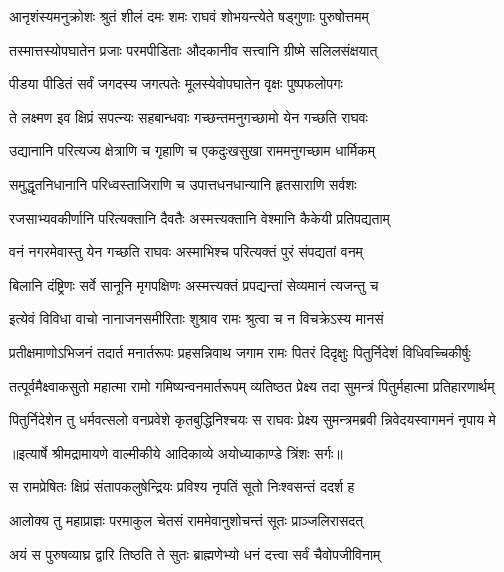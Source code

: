 \twolineshloka
{आनृशंस्यमनुक्रोशः श्रुतं शीलं दमः शमः}
{राघवं शोभयन्त्येते षड्गुणाः पुरुषोत्तमम्} %

\twolineshloka
{तस्मात्तस्योपघातेन प्रजाः परमपीडिताः}
{औदकानीव सत्त्वानि ग्रीष्मे सलिलसंक्षयात्} %

\twolineshloka
{पीडया पीडितं सर्वं जगदस्य जगत्पतेः}
{मूलस्येवोपघातेन वृक्षः पुष्पफलोपगः} %

\twolineshloka
{ते लक्ष्मण इव क्षिप्रं सपत्न्यः सहबान्धवाः}
{गच्छन्तमनुगच्छामो येन गच्छति राघवः} %

\twolineshloka
{उद्यानानि परित्यज्य क्षेत्राणि च गृहाणि च}
{एकदुःखसुखा राममनुगच्छाम धार्मिकम्} %

\twolineshloka
{समुद्धृतनिधानानि परिध्वस्ताजिराणि च}
{उपात्तधनधान्यानि हृतसाराणि सर्वशः} %

\twolineshloka
{रजसाभ्यवकीर्णानि परित्यक्तानि दैवतैः}
{अस्मत्त्यक्तानि वेश्मानि कैकेयी प्रतिपद्यताम्} %

\twolineshloka
{वनं नगरमेवास्तु येन गच्छति राघवः}
{अस्माभिश्च परित्यक्तं पुरं संपद्यतां वनम्} %

\twolineshloka
{बिलानि दंष्ट्रिणः सर्वे सानूनि मृगपक्षिणः}
{अस्मत्त्यक्तं प्रपद्यन्तां सेव्यमानं त्यजन्तु च} %

\twolineshloka
{इत्येवं विविधा वाचो नानाजनसमीरिताः}
{शुश्राव रामः श्रुत्वा च न विचक्रेऽस्य मानसं} %

\fourlineindentedshloka
{प्रतीक्षमाणोऽभिजनं तदार्त}
{मनार्तरूपः प्रहसन्निवाथ}
{जगाम रामः पितरं दिदृक्षुः}
{ पितुर्निदेशं विधिवच्चिकीर्षुः} %

\fourlineindentedshloka
{तत्पूर्वमैक्ष्वाकसुतो महात्मा}
{ रामो गमिष्यन्वनमार्तरूपम्}
{व्यतिष्ठत प्रेक्ष्य तदा सुमन्त्रं}
{ पितुर्महात्मा प्रतिहारणार्थम्} %

\fourlineindentedshloka
{पितुर्निदेशेन तु धर्मवत्सलो}
{ वनप्रवेशे कृतबुद्धिनिश्चयः}
{स राघवः प्रेक्ष्य सुमन्त्रमब्रवी}
{न्निवेदयस्वागमनं नृपाय मे} %


{॥इत्यार्षे श्रीमद्रामायणे वाल्मीकीये आदिकाव्ये अयोध्याकाण्डे त्रिंशः सर्गः॥}


\twolineshloka
{स रामप्रेषितः क्षिप्रं संतापकलुषेन्द्रियः}
{प्रविश्य नृपतिं सूतो निःश्वसन्तं ददर्श ह} %

\twolineshloka
{आलोक्य तु महाप्राज्ञः परमाकुल चेतसं}
{राममेवानुशोचन्तं सूतः प्राञ्जलिरासदत्} %

\twolineshloka
{अयं स पुरुषव्याघ्र द्वारि तिष्ठति ते सुतः}
{ब्राह्मणेभ्यो धनं दत्त्वा सर्वं चैवोपजीविनाम्} %

